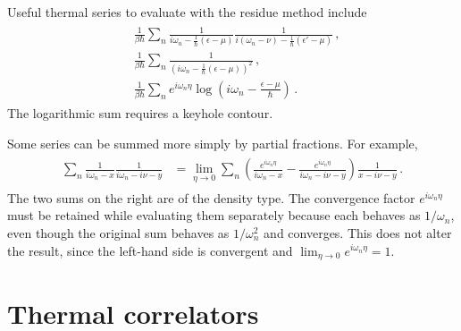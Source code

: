 \documentclass[../QFT_main.tex]{subfiles}
\begin{document}
\begin{mytheorem}
Useful thermal series to evaluate with the residue method include
{\small\begin{align}\begin{aligned}
    &\tfrac{1}{\beta\hbar}
    \sum_n
    \tfrac{1}{
        i\omega_n-\tfrac{1}{\hbar}(\epsilon-\mu)
    }
    \tfrac{1}{
        i(\omega_n-\nu)-\tfrac{1}{\hbar}(\epsilon'-\mu)
    }\,,
    \\
    &\tfrac{1}{\beta\hbar}
    \sum_n
    \tfrac{1}{
        \left(
            i\omega_n-\tfrac{1}{\hbar}(\epsilon-\mu)
        \right)^2
    }\,,
    \\
    &\tfrac{1}{\beta\hbar}
    \sum_n e^{i\omega_n\eta}
    \log\left(
        i\omega_n-\tfrac{\epsilon-\mu}{\hbar}
    \right)\,.
\end{aligned}\end{align}}
The logarithmic sum requires a keyhole contour.

Some series can be summed more simply by partial fractions.
For example,
{\small\begin{align}\begin{aligned}
    \sum_n
    \tfrac{1}{i\omega_n-x}
    \tfrac{1}{i\omega_n-i\nu-y}
    &=
    \lim_{\eta\to0}
    \sum_n
    \left(
        \tfrac{e^{i\omega_n\eta}}{i\omega_n-x}
        -
        \tfrac{e^{i\omega_n\eta}}{i\omega_n-i\nu-y}
    \right)
    \tfrac{1}{x-i\nu-y}\,.
\end{aligned}\end{align}}
The two sums on the right are of the density type.
The convergence factor $e^{i\omega_n\eta}$ must be retained while evaluating them separately because each behaves as $1/\omega_n$, even though the original sum behaves as $1/\omega_n^2$ and converges.
This does not alter the result, since the left-hand side is convergent and $\lim_{\eta\to0}e^{i\omega_n\eta}=1$.
\end{mytheorem}


\section{Thermal correlators}





\end{document}
